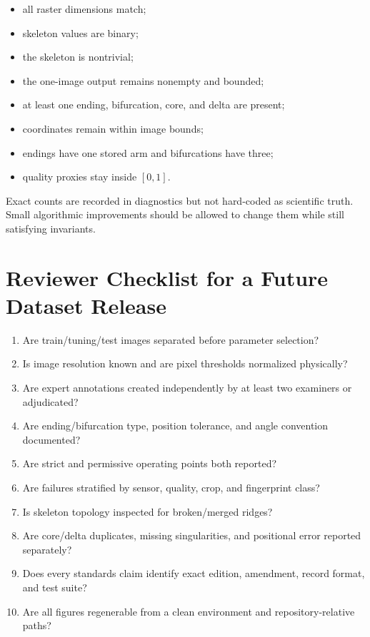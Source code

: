 \documentclass[11pt]{article}
\begin{document}
\begin{itemize}
  \item all raster dimensions match;
  \item skeleton values are binary;
  \item the skeleton is nontrivial;
  \item the one-image output remains nonempty and bounded;
  \item at least one ending, bifurcation, core, and delta are present;
  \item coordinates remain within image bounds;
  \item endings have one stored arm and bifurcations have three;
  \item quality proxies stay inside $[0,1]$.
\end{itemize}

Exact counts are recorded in diagnostics but not hard-coded as scientific truth. Small algorithmic improvements should be allowed to change them while still satisfying invariants.

\section{Reviewer Checklist for a Future Dataset Release}

\begin{enumerate}
  \item Are train/tuning/test images separated before parameter selection?
  \item Is image resolution known and are pixel thresholds normalized physically?
  \item Are expert annotations created independently by at least two examiners or adjudicated?
  \item Are ending/bifurcation type, position tolerance, and angle convention documented?
  \item Are strict and permissive operating points both reported?
  \item Are failures stratified by sensor, quality, crop, and fingerprint class?
  \item Is skeleton topology inspected for broken/merged ridges?
  \item Are core/delta duplicates, missing singularities, and positional error reported separately?
  \item Does every standards claim identify exact edition, amendment, record format, and test suite?
  \item Are all figures regenerable from a clean environment and repository-relative paths?
\end{enumerate}
\end{document}
